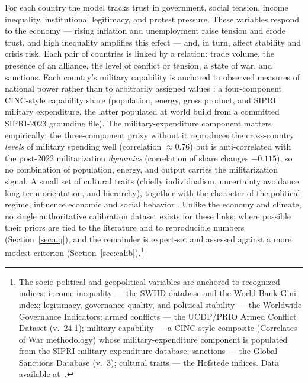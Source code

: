 \documentclass[a4paper,fleqn]{cas-sc}
\begin{document}
For each country the model tracks trust in government, social tension, income inequality,
institutional legitimacy, and protest pressure. These variables respond to the economy --- rising
inflation and unemployment raise tension and erode trust, and high inequality amplifies this effect
--- and, in turn, affect stability and crisis risk. Each pair of countries is linked by a relation:
trade volume, the presence of an alliance, the level of conflict or tension, a state of war, and
sanctions. Each country's military capability is anchored to observed measures of national power
rather than to arbitrarily assigned values \citep{singer1972}: a four-component CINC-style
capability share (population, energy, gross product, and SIPRI military expenditure, the latter
populated at world build from a committed SIPRI-2023 grounding file). The military-expenditure
component matters empirically: the three-component proxy without it reproduces the cross-country
\emph{levels} of military spending well (correlation ${\approx}0.76$) but is anti-correlated with
the post-2022 militarization \emph{dynamics} (correlation of share changes $-0.115$), so no
combination of population, energy, and output carries the militarization signal. A small set of cultural traits
(chiefly individualism, uncertainty avoidance, long-term orientation, and hierarchy), together with
the character of the political regime, influence economic and social behavior \citep{hofstede2010}.
Unlike the economy and climate, no single authoritative calibration dataset exists for these links;
where possible their priors are tied to the literature and to reproducible numbers
(Section~\ref{sec:uq}), and the remainder is expert-set and assessed against a more modest
criterion (Section~\ref{sec:calib}).\footnote{The socio-political and geopolitical variables are
anchored to recognized indices: income inequality --- the SWIID database and the World Bank Gini
index; legitimacy, governance quality, and political stability --- the Worldwide Governance
Indicators; armed conflicts --- the UCDP/PRIO Armed Conflict Dataset (v.~24.1); military capability
--- a CINC-style composite (Correlates of War methodology) whose military-expenditure component is
populated from the SIPRI military-expenditure database; sanctions --- the Global Sanctions Database (v.~3); cultural traits --- the Hofstede indices. Data available at~\citep{theclimateguy2026gim}. 

} 
\end{document}
